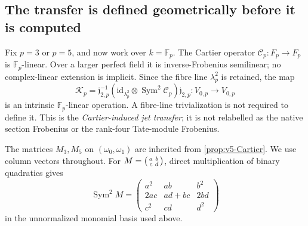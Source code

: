 \documentclass[11pt]{article}
\theoremstyle{definition}
\theoremstyle{remark}
\newcommand{\F}{\mathbb F}
\newcommand{\id}{\mathrm{id}}
\begin{document}
\subsection{The transfer is defined geometrically before it is computed}
Fix $p=3$ or $p=5$, and now work over $k=\F_p$. The Cartier operator
$\mathcal C_p:F_p\to F_p$ is $\F_p$-linear. Over a larger perfect field
it is inverse-Frobenius semilinear; no complex-linear extension is
implicit. Since the fibre line $\lambda_p^2$ is retained, the map
\begin{equation}
 \boxed{
 \mathcal K_p=\mathfrak j_{2,p}^{-1}
  (\id_{\lambda_p^2}\otimes\operatorname{Sym}^2\mathcal C_p)\mathfrak j_{2,p}
  :V_{0,p}\longrightarrow V_{0,p}}
 \label{eq:v6-K-def}
\end{equation}
is an intrinsic $\F_p$-linear operation. A fibre-line trivialization is
not required to define it. This is the \emph{Cartier-induced jet transfer};
it is not relabelled as the native section Frobenius or the rank-four
Tate-module Frobenius.

The matrices $M_3,M_5$ on $(\omega_0,\omega_1)$ are inherited from
\cref{prop:v5-Cartier}. We use column vectors throughout. For
$M=\begin{psmallmatrix}a&b\\c&d\end{psmallmatrix}$, direct multiplication
of binary quadratics gives
\begin{equation}
 \operatorname{Sym}^2M=
 \begin{pmatrix}
 a^2&ab&b^2\\
 2ac&ad+bc&2bd\\
 c^2&cd&d^2
 \end{pmatrix}
 \label{eq:v6-Sym2-matrix}
\end{equation}
in the unnormalized monomial basis used above.
\end{document}
